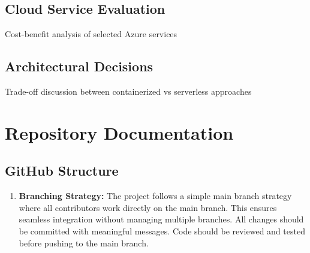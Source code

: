 \documentclass{llncs}
\begin{document}
\subsection{Cloud Service Evaluation}
Cost-benefit analysis of selected Azure services
\subsection{Architectural Decisions}
Trade-off discussion between containerized vs serverless approaches

\section{Repository Documentation}
\subsection{GitHub Structure}


\begin{enumerate}
    \item \textbf{Branching Strategy:} \newline
          The project follows a simple main branch strategy where all contributors work directly on the main branch.
          This ensures seamless integration without managing multiple branches. All changes should be committed with meaningful messages.
          Code should be reviewed and tested before pushing to the main branch.
\end{enumerate}
\end{document}

